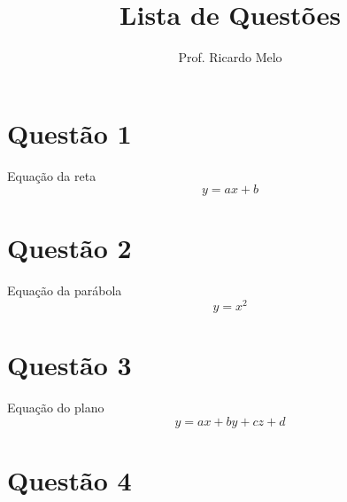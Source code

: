 \documentclass[a4paper,12pt]{article}
\title{Lista de Questões}
\author{Prof. Ricardo Melo}
\date{} %
\begin{document}

\begin{multicols}{2}
\section*{Questão 1}
\lipsum[1]

\begin{center}
    Equação da reta $$ y=ax+b $$
\end{center}

\section*{Questão 2}
\lipsum[2]

\begin{center}
Equação da parábola $$ y=x^2 $$
\end{center}

\section*{Questão 3}
\lipsum[3]

\begin{center}
    Equação do plano $$ y=ax+by+cz+d $$
\end{center}

\section*{Questão 4}
\lipsum[4]
\end{multicols}
\end{document}
